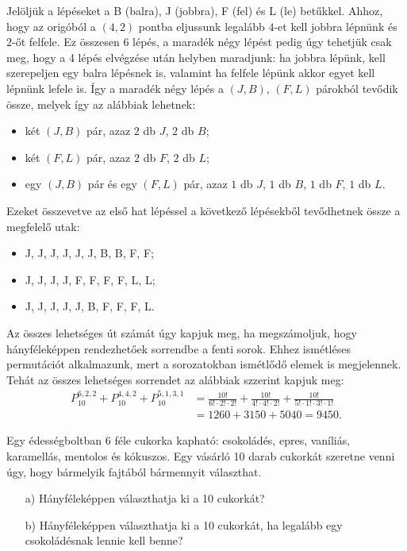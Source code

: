 \begin{solution}
Jelöljük a lépéseket a B (balra), J (jobbra), F (fel) és L (le) betűkkel.
Ahhoz, hogy az origóból a $(4,2)$ pontba eljussunk legalább $4$-et
kell jobbra lépnünk és $2$-őt felfele. Ez összesen $6$ lépés, a
maradék négy lépést pedig úgy tehetjük csak meg, hogy a 4 lépés elvégzése
után helyben maradjunk: ha jobbra lépünk, kell szerepeljen egy balra
lépésnek is, valamint ha felfele lépünk akkor egyet kell lépnünk lefele
is. Így a maradék négy lépés a $(J,B)$, $(F,L)$ párokból tevődik
össze, melyek így az alábbiak lehetnek: 
\begin{itemize}
\item két $(J,B)$ pár, azaz $2$ db $J$, $2$ db $B$; 
\item két $(F,L)$ pár, azaz $2$ db $F$, $2$ db $L$; 
\item egy $(J,B)$ pár és egy $(F,L)$ pár, azaz $1$ db $J$, $1$ db $B$,
$1$ db $F$, $1$ db $L$. 
\end{itemize}
Ezeket összevetve az első hat lépéssel a következő lépésekből tevődhetnek
össze a megfelelő utak: 
\begin{itemize}
\item J, J, J, J, J, J, B, B, F, F; 
\item J, J, J, J, F, F, F, F, L, L; 
\item J, J, J, J, J, B, F, F, F, L. 
\end{itemize}
Az összes lehetséges út számát úgy kapjuk meg, ha megszámoljuk, hogy
hányféleképpen rendezhetőek sorrendbe a fenti sorok. Ehhez ismétléses
permutációt alkalmazunk, mert a sorozatokban ismétlődő elemek is megjelennek.
Tehát az összes lehetséges sorrendet az alábbiak szzerint kapjuk meg:
\begin{align*}
P_{10}^{6,2,2}+P_{10}^{4,4,2}+P_{10}^{5,1,3,1} & =\frac{10!}{6!\cdot2!\cdot2!}+\frac{10!}{4!\cdot4!\cdot2!}+\frac{10!}{5!\cdot1!\cdot3!\cdot1!}\\
 & =1260+3150+5040=9450.
\end{align*}
\end{solution}
\begin{extraproblem}
Egy édességboltban 6 féle cukorka kapható: csokoládés, epres, vaníliás,
karamellás, mentolos és kókuszos. Egy vásárló 10 darab cukorkát szeretne
venni úgy, hogy bármelyik fajtából bármennyit választhat.
\begin{enumerate}
\item[a)] Hányféleképpen választhatja ki a 10 cukorkát? 
\item[b)] Hányféleképpen választhatja ki a 10 cukorkát, ha legalább egy csokoládésnak
lennie kell benne? 
\end{enumerate}
\end{extraproblem}

